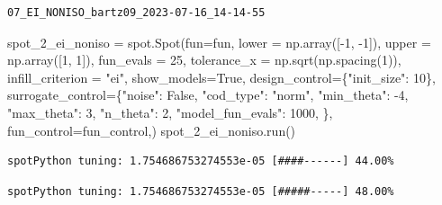 \documentclass[
  letterpaper,
  DIV=11,
  numbers=noendperiod]{scrreprt}
\newenvironment{Shaded}{\begin{snugshade}}{\end{snugshade}}
\newcommand{\DecValTok}[1]{\textcolor[rgb]{0.68,0.00,0.00}{#1}}
\newcommand{\NormalTok}[1]{\textcolor[rgb]{0.00,0.23,0.31}{#1}}
\newcommand{\OperatorTok}[1]{\textcolor[rgb]{0.37,0.37,0.37}{#1}}
\newcommand{\StringTok}[1]{\textcolor[rgb]{0.13,0.47,0.30}{#1}}
\newcommand{\VariableTok}[1]{\textcolor[rgb]{0.07,0.07,0.07}{#1}}
\begin{document}
\begin{verbatim}
07_EI_NONISO_bartz09_2023-07-16_14-14-55
\end{verbatim}

\begin{Shaded}
\begin{Highlighting}[]
\NormalTok{spot\_2\_ei\_noniso }\OperatorTok{=}\NormalTok{ spot.Spot(fun}\OperatorTok{=}\NormalTok{fun,}
\NormalTok{                   lower }\OperatorTok{=}\NormalTok{ np.array([}\OperatorTok{{-}}\DecValTok{1}\NormalTok{, }\OperatorTok{{-}}\DecValTok{1}\NormalTok{]),}
\NormalTok{                   upper }\OperatorTok{=}\NormalTok{ np.array([}\DecValTok{1}\NormalTok{, }\DecValTok{1}\NormalTok{]),}
\NormalTok{                   fun\_evals }\OperatorTok{=} \DecValTok{25}\NormalTok{,}
\NormalTok{                   tolerance\_x }\OperatorTok{=}\NormalTok{ np.sqrt(np.spacing(}\DecValTok{1}\NormalTok{)),}
\NormalTok{                   infill\_criterion }\OperatorTok{=} \StringTok{"ei"}\NormalTok{,}
\NormalTok{                   show\_models}\OperatorTok{=}\VariableTok{True}\NormalTok{,}
\NormalTok{                   design\_control}\OperatorTok{=}\NormalTok{\{}\StringTok{"init\_size"}\NormalTok{: }\DecValTok{10}\NormalTok{\},}
\NormalTok{                   surrogate\_control}\OperatorTok{=}\NormalTok{\{}\StringTok{"noise"}\NormalTok{: }\VariableTok{False}\NormalTok{,}
                                      \StringTok{"cod\_type"}\NormalTok{: }\StringTok{"norm"}\NormalTok{,}
                                      \StringTok{"min\_theta"}\NormalTok{: }\OperatorTok{{-}}\DecValTok{4}\NormalTok{,}
                                      \StringTok{"max\_theta"}\NormalTok{: }\DecValTok{3}\NormalTok{,}
                                      \StringTok{"n\_theta"}\NormalTok{: }\DecValTok{2}\NormalTok{,}
                                      \StringTok{"model\_fun\_evals"}\NormalTok{: }\DecValTok{1000}\NormalTok{,}
\NormalTok{                                      \},}
\NormalTok{                    fun\_control}\OperatorTok{=}\NormalTok{fun\_control,)}
\NormalTok{spot\_2\_ei\_noniso.run()}
\end{Highlighting}
\end{Shaded}

\begin{verbatim}
spotPython tuning: 1.754686753274553e-05 [####------] 44.00% 
\end{verbatim}

\begin{verbatim}
spotPython tuning: 1.754686753274553e-05 [#####-----] 48.00% 
\end{verbatim}
\end{document}
